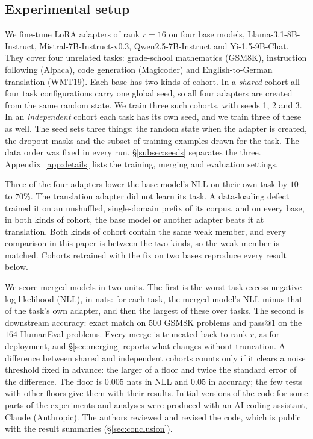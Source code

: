 \subsection{Experimental setup}\label{subsec:setup}

We fine-tune LoRA adapters of rank $r = 16$ on four base models,
Llama-3.1-8B-Instruct, Mistral-7B-Instruct-v0.3, Qwen2.5-7B-Instruct and
Yi-1.5-9B-Chat. They cover four unrelated tasks: grade-school mathematics
(GSM8K), instruction following (Alpaca), code generation (Magicoder) and
English-to-German translation (WMT19). Each base has two kinds of cohort. In a
\emph{shared} cohort all four task configurations carry one global seed, so
all four adapters are created from the same random state. We train three such
cohorts, with seeds 1, 2 and 3. In an \emph{independent} cohort each task has
its own seed, and we train three of these as well. The seed sets three things:
the random state when the adapter is created, the dropout masks and the
subset of training examples drawn for the task. The data order was fixed in
every run. \S\ref{subsec:seeds} separates the three. Appendix~\ref{app:details} lists the
training, merging and evaluation settings.

Three of the four adapters lower the base model's NLL on their own task by
$10$ to $70\%$. The translation adapter did not learn its task. A data-loading
defect trained it on an unshuffled, single-domain prefix of its corpus, and on
every base, in both kinds of cohort, the base model or another adapter beats
it at translation. Both kinds of cohort contain the same weak member, and
every comparison in this paper is between the two kinds, so the weak member
is matched. Cohorts
retrained with the fix on two bases reproduce every result below.

We score merged models in two units. The first is the worst-task excess
negative log-likelihood (NLL), in nats: for each task, the merged model's NLL minus that of
the task's own adapter, and then the largest of these over tasks. The second
is downstream accuracy: exact match on $500$ GSM8K problems and pass@1 on the
$164$ HumanEval problems. Every merge is truncated back to rank $r$, as for
deployment, and \S\ref{sec:merging} reports what changes without truncation.
A difference between shared and independent cohorts counts only if it
clears a noise threshold fixed in advance: the larger of a floor and twice
the standard error of the difference. The floor is $0.005$ nats in NLL and
$0.05$ in accuracy; the few tests with other floors give them with their
results.
Initial versions of the code for some parts of the experiments and analyses
were produced with an AI coding assistant, Claude (Anthropic). The authors
reviewed and revised the code, which is public with the result summaries
(\S\ref{sec:conclusion}).

